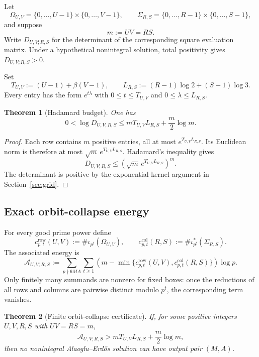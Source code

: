 \documentclass[11pt]{article}
\newtheorem{theorem}{Theorem}[section]
\theoremstyle{definition}
\theoremstyle{remark}
\begin{document}
Let
\[
 \Omega_{U,V}=\{0,\ldots,U-1\}\times\{0,\ldots,V-1\},
 \qquad
 \Sigma_{R,S}=\{0,\ldots,R-1\}\times\{0,\ldots,S-1\},
\]
and suppose
\[
 m:=UV=RS.
\]
Write $D_{U,V;R,S}$ for the determinant of the corresponding square evaluation matrix.  Under a hypothetical nonintegral solution, total positivity gives $D_{U,V;R,S}>0$.

Set
\begin{equation}
 T_{U,V}:=(U-1)+\beta(V-1),
 \qquad
 L_{R,S}:=(R-1)\log2+(S-1)\log3.
 \label{eq:TL}
\end{equation}
Every entry has the form $e^{t\lambda}$ with $0\le t\le T_{U,V}$ and $0\le\lambda\le L_{R,S}$.

\begin{theorem}[Hadamard budget]
\label{thm:hadamard}
One has
\begin{equation}
 0<\log D_{U,V;R,S}
 \le mT_{U,V}L_{R,S}+\frac m2\log m.
 \label{eq:hadamard-budget}
\end{equation}
\end{theorem}

\begin{proof}
Each row contains $m$ positive entries, all at most $e^{T_{U,V}L_{R,S}}$.  Its Euclidean norm is therefore at most
$\sqrt m\,e^{T_{U,V}L_{R,S}}$.  Hadamard's inequality gives
\[
 D_{U,V;R,S}
 \le\left(\sqrt m\,e^{T_{U,V}L_{R,S}}\right)^m.
\]
The determinant is positive by the exponential-kernel argument in Section~\ref{sec:grid}.
\end{proof}

\subsection{Exact orbit-collapse energy}

For every good prime power define
\[
 c^{\mathrm{row}}_{p,t}(U,V)
 :=\#\iota_{p^t}(\Omega_{U,V}),
 \qquad
 c^{\mathrm{col}}_{p,t}(R,S)
 :=\#\iota^*_{p^t}(\Sigma_{R,S}).
\]
The associated energy is
\begin{equation}
 \mathscr A_{U,V;R,S}
 :=\sum_{p\nmid6MA}\sum_{t\ge1}
 \left(m-\min\{c^{\mathrm{row}}_{p,t}(U,V),
                  c^{\mathrm{col}}_{p,t}(R,S)\}\right)\log p.
 \label{eq:orbit-energy}
\end{equation}
Only finitely many summands are nonzero for fixed boxes: once the reductions of all rows and columns are pairwise distinct modulo $p^t$, the corresponding term vanishes.

\begin{theorem}[Finite orbit-collapse certificate]
\label{thm:finite-certificate}
If, for some positive integers $U,V,R,S$ with $UV=RS=m$,
\begin{equation}
 \mathscr A_{U,V;R,S}
 >mT_{U,V}L_{R,S}+\frac m2\log m,
 \label{eq:finite-certificate}
\end{equation}
then no nonintegral Alaoglu--Erd\H{o}s solution can have output pair $(M,A)$.
\end{theorem}
\end{document}
